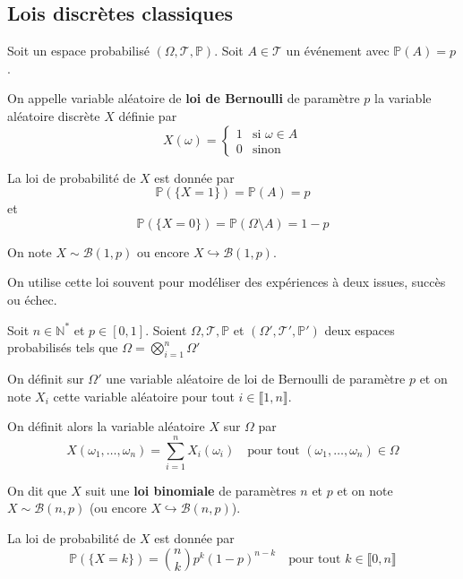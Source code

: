 \documentclass[a4paper, 12pt]{article}
\begin{document}
\begin{demonstration}
\end{demonstration}

\subsection{Lois discrètes classiques}

\begin{definition}
    Soit un espace probabilisé $(\Omega, \mathcal{T}, \mathbb{P})$.
    Soit $A \in \mathcal{T}$ un événement avec $\mathbb{P}(A) = p$.

    On appelle variable aléatoire de \textbf{loi de Bernoulli} de paramètre $p$ la variable aléatoire discrète $X$ définie par
    $$
    X(\omega) = \begin{cases}
    1 & \text{si } \omega \in A \\
    0 & \text{sinon}
    \end{cases}
    $$

    La loi de probabilité de $X$ est donnée par
    $$
    \mathbb{P}(\{ X = 1 \}) = \mathbb{P}(A) = p
    $$
    et
    $$
    \mathbb{P}(\{ X = 0 \}) = \mathbb{P}(\Omega \setminus A) = 1 - p
    $$

    On note $X \sim \mathcal{B}(1, p)$ ou encore $X \hookrightarrow \mathcal{B}(1, p)$.
\end{definition}

\begin{remarque}
    On utilise cette loi souvent pour modéliser des expériences à deux issues, succès ou échec.
\end{remarque}

\begin{definition}
    Soit $n \in \mathbb{N}^*$ et $p \in [0, 1]$.
    Soient $\Omega, \mathcal{T}, \mathbb{P}$ et $(\Omega', \mathcal{T}', \mathbb{P}')$ deux espaces probabilisés tels que $\Omega = \bigotimes_{i=1}^n \Omega'$

    On définit sur $\Omega'$ une variable aléatoire de loi de Bernoulli de paramètre $p$ et on note $X_i$ cette variable aléatoire pour tout $i \in \llbracket 1, n \rrbracket$.

    On définit alors la variable aléatoire $X$ sur $\Omega$ par
    $$
    X(\omega_1, \ldots, \omega_n) = \sum_{i=1}^n X_i(\omega_i) \quad \text{pour tout } (\omega_1, \ldots, \omega_n) \in \Omega
    $$

    On dit que $X$ suit une \textbf{loi binomiale} de paramètres $n$ et $p$ et on note $X \sim \mathcal{B}(n, p)$ (ou encore $X \hookrightarrow \mathcal{B}(n, p)$).

    La loi de probabilité de $X$ est donnée par
    $$
    \mathbb{P}(\{ X = k \}) = \binom{n}{k} p^k (1-p)^{n-k} \quad \text{pour tout } k \in \llbracket 0, n \rrbracket
    $$
\end{definition}
\end{document}
